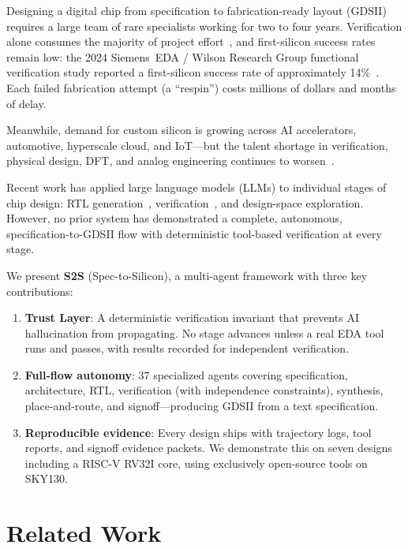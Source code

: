 \documentclass[journal]{IEEEtran}
\begin{document}
Designing a digital chip from specification to fabrication-ready layout (GDSII) requires a large team of rare specialists working for two to four years. Verification alone consumes the majority of project effort~\cite{wilson2024}, and first-silicon success rates remain low: the 2024 Siemens~EDA / Wilson Research Group functional verification study reported a first-silicon success rate of approximately 14\%~\cite{wilson2024}. Each failed fabrication attempt (a ``respin'') costs millions of dollars and months of delay.

Meanwhile, demand for custom silicon is growing across AI accelerators, automotive, hyperscale cloud, and IoT---but the talent shortage in verification, physical design, DFT, and analog engineering continues to worsen~\cite{semiengineering2023}.

Recent work has applied large language models (LLMs) to individual stages of chip design: RTL generation~\cite{thakur2024verigen, liu2023chipnemo, blocklove2023chipchat}, verification~\cite{orenesvera2023using}, and design-space exploration. However, no prior system has demonstrated a complete, autonomous, specification-to-GDSII flow with deterministic tool-based verification at every stage.

We present \textbf{S2S} (Spec-to-Silicon), a multi-agent framework with three key contributions:

\begin{enumerate}
    \item \textbf{Trust Layer}: A deterministic verification invariant that prevents AI hallucination from propagating. No stage advances unless a real EDA tool runs and passes, with results recorded for independent verification.
    \item \textbf{Full-flow autonomy}: 37 specialized agents covering specification, architecture, RTL, verification (with independence constraints), synthesis, place-and-route, and signoff---producing GDSII from a text specification.
    \item \textbf{Reproducible evidence}: Every design ships with trajectory logs, tool reports, and signoff evidence packets. We demonstrate this on seven designs including a RISC-V RV32I core, using exclusively open-source tools on SKY130.
\end{enumerate}

\section{Related Work}
\label{sec:related}
\end{document}

